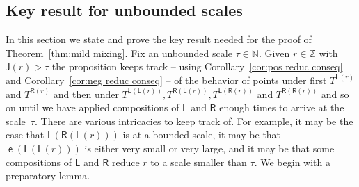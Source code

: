 \documentclass[10pt]{amsart}
\theoremstyle{definition}\newtheorem{defi}[theo]{Definition}\newtheorem{rema}[theo]{Remark}\newtheorem{exam}[theo]{Example}\newtheorem{exem}[theo]{Example}\newtheorem{nota}[theo]{Notation}
\DeclareMathOperator{\lst}{\mathsf{e}}
\newcommand{\N}{\mathbb{N}}
\newcommand{\Z}{\mathbb{Z}}
\newcommand{\lft}{\mathsf{L}}
\newcommand{\rht}{\mathsf{R}}
\newcommand{\scl}{\mathsf{J}}
\begin{document}
\subsection{Key result for unbounded scales}\label{subsec:reduction main}

In this section we state and prove the key result needed for the proof of Theorem~\ref{thm:mild mixing}. Fix an unbounded scale $\tau \in \N$. Given $r
\in \Z$ with $\scl(r) > \tau$ the proposition keeps track -- using Corollary~\ref{cor:pos reduc conseq} and Corollary~\ref{cor:neg reduc conseq} -- of the behavior of points under first $T^{\lft(r)}$ and $T^{\rht(r)}$ and then under $T^{\lft(\lft(r))}, T^{\rht(\lft(r))}, T^{\lft(\rht(r))}$ and $T^{\rht(\rht(r))}$ and so on until we have applied compositions of $\lft$ and $\rht$ enough times to arrive at the scale~$\tau$. There are various intricacies to keep track of. For example, it may be the case that $\lft(\rht(\lft(r)))$ is at a bounded scale, it may be that $\lst(\lft(\lft(r)))$ is either very small or very large, and it may be that some compositions of $\lft$ and $\rht$ reduce $r$ to a scale smaller than $\tau$. We begin with a preparatory lemma.
\end{document}
